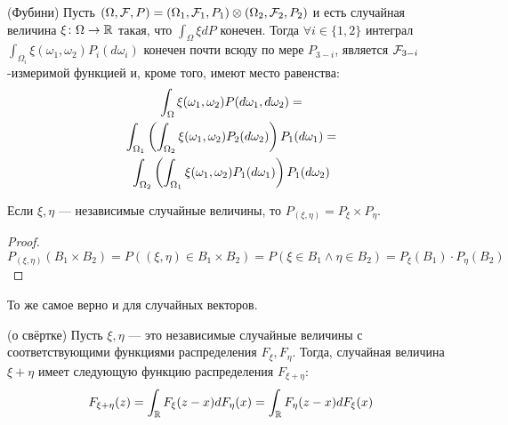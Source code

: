 \begin{theorem} (Фубини)
	Пусть $(\Omega, \mathcal{F}, P) = (\Omega_1, \mathcal{F}_1, P_1) \otimes (\Omega_2, \mathcal{F}_2, P_2)$ и есть случайная величина $\xi \colon \Omega \to \mathbb{R}$ такая, что $\int_\Omega \xi dP$ конечен. Тогда $\forall i \in \{1, 2\}$ интеграл $\int_{\Omega_i} \xi(\omega_1, \omega_2) P_i(d\omega_i)$ конечен почти всюду по мере $P_{3 - i}$, является $\mathcal{F}_{3 - i}$-измеримой функцией и, кроме того, имеют место равенства:
	\begin{multline*}
		\int_\Omega \xi(\omega_1, \omega_2) P(d\omega_1, d\omega_2) =
		\\
		\int_{\Omega_1} \left(\int_{\Omega_2} \xi(\omega_1, \omega_2)P_2(d\omega_2)\right) P_1(d\omega_1) =
		\\
		\int_{\Omega_2} \left(\int_{\Omega_1} \xi(\omega_1, \omega_2)P_1(d\omega_1)\right) P_1(d\omega_2)
	\end{multline*}
\end{theorem}

\begin{proposition}
	Если $\xi, \eta$ --- независимые случайные величины, то $P_{(\xi, \eta)} = P_\xi \times P_\eta$.
\end{proposition}

\begin{proof}
	\[
		P_{(\xi, \eta)}(B_1 \times B_2) = P((\xi, \eta) \in B_1 \times B_2) = P(\xi \in B_1 \wedge \eta \in B_2) = P_\xi(B_1) \cdot P_\eta(B_2)
	\]
\end{proof}

\begin{note}
	То же самое верно и для случайных векторов.
\end{note}

\begin{lemma} (о свёртке)
	Пусть $\xi, \eta$ --- это независимые случайные величины с соответствующими функциями распределения $F_\xi, F_\eta$. Тогда, случайная величина $\xi + \eta$ имеет следующую функцию распределения $F_{\xi + \eta}$:
	\[
		F_{\xi + \eta}(z) = \int_{\mathbb{R}} F_\xi(z - x)dF_\eta(x) = \int_{\mathbb{R}} F_\eta(z - x)dF_\xi(x)
	\]
\end{lemma}

